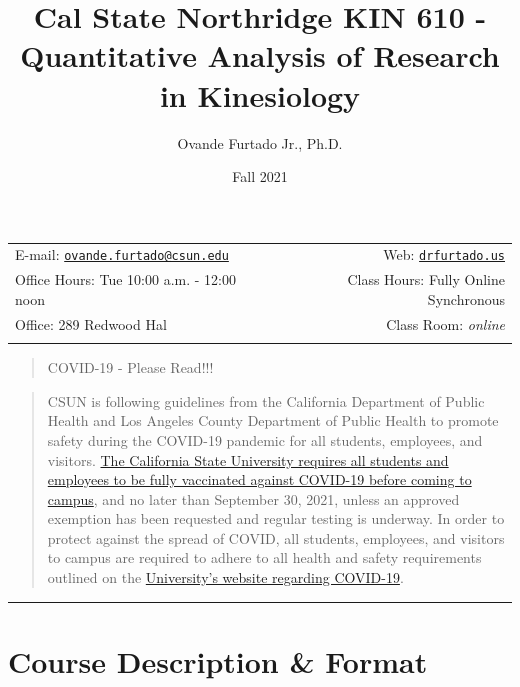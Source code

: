 \documentclass[11pt,]{article}
\title{Cal State Northridge \textbar{} KIN 610 - Quantitative Analysis
of Research in Kinesiology}
\author{Ovande Furtado Jr., Ph.D.}
\date{Fall 2021}
\begin{document}
  

		\maketitle
		
	
		\thispagestyle{firststyle}



	\noindent \begin{tabular*}{\textwidth}{ @{\extracolsep{\fill}} lr @{\extracolsep{\fill}}}


E-mail: \texttt{\href{mailto:ovande.furtado@csun.edu}{\nolinkurl{ovande.furtado@csun.edu}}} & Web: \href{http://drfurtado.us}{\tt drfurtado.us}\\
Office Hours: Tue 10:00 a.m. - 12:00 noon  &  Class Hours: Fully Online
Synchronous\\
Office: 289 Redwood Hal  & Class Room: \emph{online}\\
	&  \\
	\hline
	\end{tabular*}
	
\vspace{2mm}
	


\begin{quote}
COVID-19 - Please Read!!!
\end{quote}

\begin{quote}
CSUN is following guidelines from the California Department of Public
Health and Los Angeles County Department of Public Health to promote
safety during the COVID-19 pandemic for all students, employees, and
visitors.
\href{http://www.csun.edu/ua/email/NCpages/0813_student_vaccination.html}{The
California State University requires all students and employees to be
fully vaccinated against COVID-19 before coming to campus}, and no later
than September 30, 2021, unless an approved exemption has been requested
and regular testing is underway. In order to protect against the spread
of COVID, all students, employees, and visitors to campus are required
to adhere to all health and safety requirements outlined on the
\href{https://www.csun.edu/matadors-forward/health-and-safety}{University's
website regarding COVID-19}.
\end{quote}

\begin{center}\rule{0.5\linewidth}{0.5pt}\end{center}

\hypertarget{course-description-format}{%
\section{Course Description \& Format}\label{course-description-format}}
\end{document}
